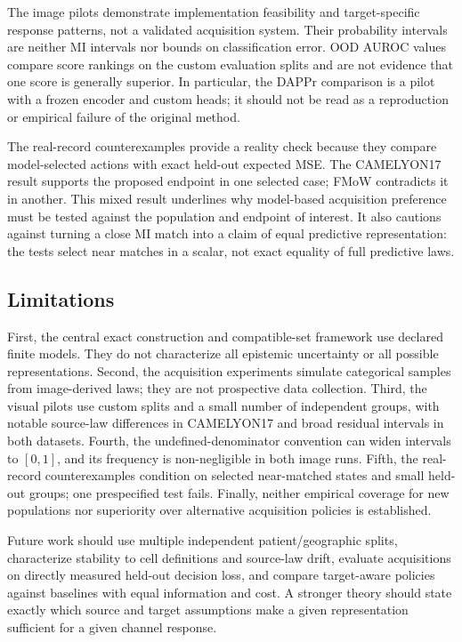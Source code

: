\documentclass[11pt]{article}
\begin{document}
The image pilots demonstrate implementation feasibility and target-specific response patterns, not a validated acquisition system. Their probability intervals are neither MI intervals nor bounds on classification error. OOD AUROC values compare score rankings on the custom evaluation splits and are not evidence that one score is generally superior. In particular, the DAPPr comparison is a pilot with a frozen encoder and custom heads; it should not be read as a reproduction or empirical failure of the original method.

The real-record counterexamples provide a reality check because they compare model-selected actions with exact held-out expected MSE. The CAMELYON17 result supports the proposed endpoint in one selected case; FMoW contradicts it in another. This mixed result underlines why model-based acquisition preference must be tested against the population and endpoint of interest. It also cautions against turning a close MI match into a claim of equal predictive representation: the tests select near matches in a scalar, not exact equality of full predictive laws.

\subsection{Limitations}

First, the central exact construction and compatible-set framework use declared finite models. They do not characterize all epistemic uncertainty or all possible representations. Second, the acquisition experiments simulate categorical samples from image-derived laws; they are not prospective data collection. Third, the visual pilots use custom splits and a small number of independent groups, with notable source-law differences in CAMELYON17 and broad residual intervals in both datasets. Fourth, the undefined-denominator convention can widen intervals to $[0,1]$, and its frequency is non-negligible in both image runs. Fifth, the real-record counterexamples condition on selected near-matched states and small held-out groups; one prespecified test fails. Finally, neither empirical coverage for new populations nor superiority over alternative acquisition policies is established.

Future work should use multiple independent patient/geographic splits, characterize stability to cell definitions and source-law drift, evaluate acquisitions on directly measured held-out decision loss, and compare target-aware policies against baselines with equal information and cost. A stronger theory should state exactly which source and target assumptions make a given representation sufficient for a given channel response.
\end{document}
